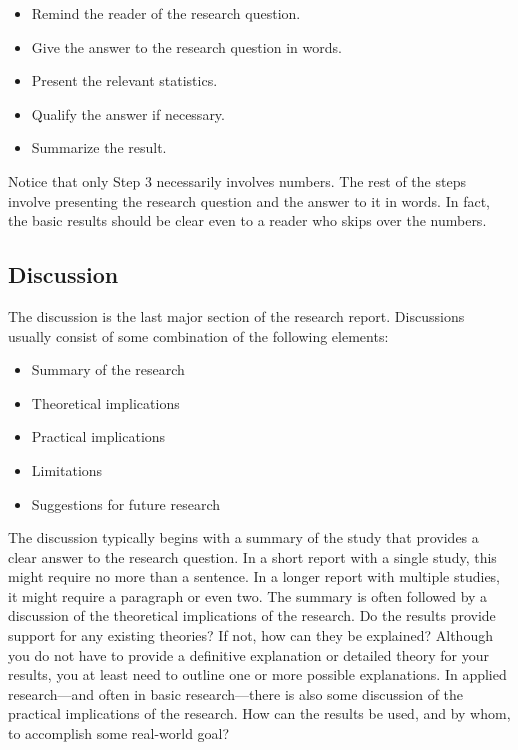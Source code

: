\begin{itemize}

\item Remind the reader of the research question.
\item Give the answer to the research question in words.
\item Present the relevant statistics.
\item Qualify the answer if necessary.
\item Summarize the result.

\end{itemize}

Notice that only Step 3 necessarily involves numbers. The rest of the steps involve presenting the research question and the answer to it in words. In fact, the basic results should be clear even to a reader who skips over the numbers.

\subsection{Discussion}

The discussion is the last major section of the research report. Discussions usually consist of some combination of the following elements:

\begin{itemize}
\item Summary of the research
\item Theoretical implications
\item Practical implications
\item Limitations
\item Suggestions for future research
\end{itemize}

The discussion typically begins with a summary of the study that provides a clear answer to the research question. In a short report with a single study, this might require no more than a sentence. In a longer report with multiple studies, it might require a paragraph or even two. The summary is often followed by a discussion of the theoretical implications of the research. Do the results provide support for any existing theories? If not, how can they be explained? Although you do not have to provide a definitive explanation or detailed theory for your results, you at least need to outline one or more possible explanations. In applied research---and often in basic research---there is also some discussion of the practical implications of the research. How can the results be used, and by whom, to accomplish some real-world goal?

